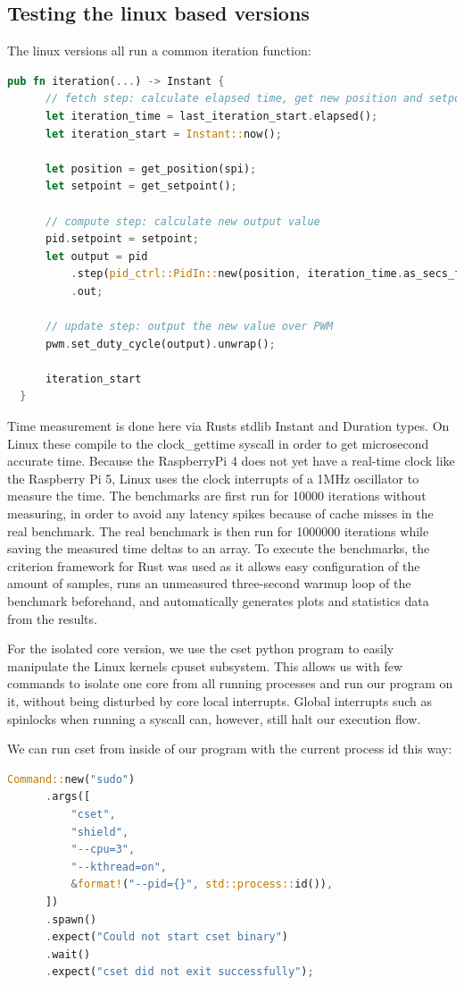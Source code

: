 \subsection{Testing the linux based versions}
The linux versions all run a common iteration function:
\begin{lstlisting}[language=Rust,style=colouredRust]
  pub fn iteration(...) -> Instant {
      // fetch step: calculate elapsed time, get new position and setpoint
      let iteration_time = last_iteration_start.elapsed();
      let iteration_start = Instant::now();
  
      let position = get_position(spi);
      let setpoint = get_setpoint();
  
      // compute step: calculate new output value
      pid.setpoint = setpoint;
      let output = pid
          .step(pid_ctrl::PidIn::new(position, iteration_time.as_secs_f64()))
          .out;
  
      // update step: output the new value over PWM
      pwm.set_duty_cycle(output).unwrap();
  
      iteration_start
  }
\end{lstlisting}

Time measurement is done here via Rusts stdlib Instant and Duration types.
On Linux these compile to the clock\_gettime syscall in order to get microsecond accurate time.
Because the RaspberryPi 4 does not yet have a real-time clock like the Raspberry Pi 5,
Linux uses the clock interrupts of a 1MHz oscillator to measure the time.
The benchmarks are first run for 10000 iterations without measuring, in order to avoid any latency spikes because of cache misses in the real benchmark.
The real benchmark is then run for 1000000 iterations while saving the measured time deltas to an array.
To execute the benchmarks, the criterion framework for Rust was used as it allows easy configuration of the amount of samples,
runs an unmeasured three-second warmup loop of the benchmark beforehand, and automatically generates plots and statistics data from the results.

For the isolated core version, we use the cset python program to easily manipulate the Linux kernels cpuset subsystem.
This allows us with few commands to isolate one core from all running processes and run our program on it, without being disturbed by core local interrupts.
Global interrupts such as spinlocks when running a syscall can, however, still halt our execution flow.

We can run cset from inside of our program with the current process id this way:
\begin{lstlisting}[language=Rust,style=colouredRust]
  Command::new("sudo")
      .args([
          "cset",
          "shield",
          "--cpu=3",
          "--kthread=on",
          &format!("--pid={}", std::process::id()),
      ])
      .spawn()
      .expect("Could not start cset binary")
      .wait()
      .expect("cset did not exit successfully");
\end{lstlisting}

